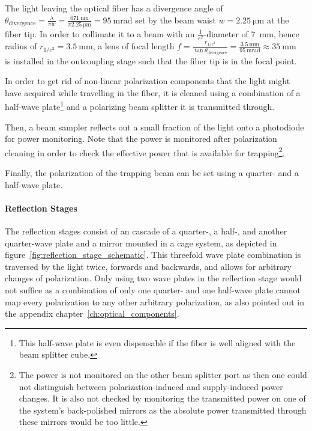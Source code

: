 The light leaving the optical fiber has a divergence angle of $\theta_\text{divergence} = \frac{\lambda}{\pi w} = \frac{\SI{671}{\nano\meter}}{\pi\SI{2.25}{\micro\meter}} = \SI{95}{\milli\radian}$ set by the beam waist $w = \SI{2.25}{\micro\meter}$ at the fiber tip. In order to collimate it to a beam with an $\frac{1}{e^2}$-diameter of \SI{7}{\milli\meter}, hence radius of $r_{1/e^2} = \SI{3.5}{\milli\meter}$, a lens of focal length $f = \frac{r_{1/e^2}}{\tan \theta_\text{divergence}} = \frac{\SI{3.5}{\milli\meter}}{\SI{95}{\milli\radian}} \approx \SI{35}{\milli\meter}$~\cite{noauthor_collimated_2021} is installed in the outcoupling stage such that the fiber tip is in the focal point.

In order to get rid of non-linear polarization components that the light might have acquired while travelling in the fiber, it is cleaned using a combination of a half-wave plate\footnote{This half-wave plate is even dispensable if the fiber is well aligned with the beam splitter cube.} and a polarizing beam splitter it is transmitted through.

Then, a beam sampler reflects out a small fraction of the light onto a photodiode for power monitoring. Note that the power is monitored after polarization cleaning in order to check the effective power that is available for trapping\footnote{The power is not monitored on the other beam splitter port as then one could not distinguish between polarization-induced and supply-induced power changes. It is also not checked by monitoring the transmitted power on one of the system's back-polished mirrors as the absolute power transmitted through these mirrors would be too little.}.

Finally, the polarization of the trapping beam can be set using a quarter- and a half-wave plate.

\paragraph{Reflection Stages}
The reflection stages consist of an cascade of a quarter-, a half-, and another quarter-wave plate and a mirror mounted in a cage system, as depicted in figure~\ref{fig:reflection_stage_schematic}. This threefold wave plate combination is traversed by the light twice, forwards and backwards, and allows for arbitrary changes of polarization. Only using two wave plates in the reflection stage would not suffice as a combination of only one quarter- and one half-wave plate cannot map every polarization to any other arbitrary polarization, as also pointed out in the appendix chapter~\ref{ch:optical_components}.

